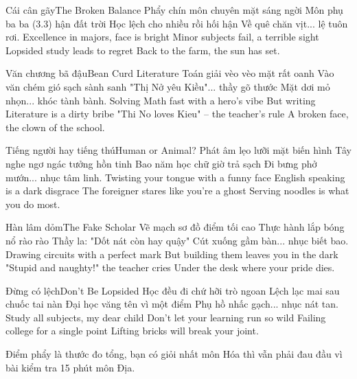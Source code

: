 \begin{tutuyetbox}{Cái cân gãy}{The Broken Balance}
Phẩy chín môn chuyên mặt sáng ngời
Môn phụ ba ba (3.3) hận đất trời
Học lệch cho nhiều rồi hối hận
Về quê chăn vịt... lệ tuôn rơi.
\tcblower
Excellence in majors, face is bright
Minor subjects fail, a terrible sight
Lopsided study leads to regret
Back to the farm, the sun has set.
\end{tutuyetbox}

\begin{tutuyetbox}{Văn chương bã đậu}{Bean Curd Literature}
Toán giải vèo vèo mặt rất oanh
Vào văn chém gió sạch sành sanh
"Thị Nở yêu Kiều"... thầy gõ thước
Mặt dơi mỏ nhọn... khóc tành bành.
\tcblower
Solving Math fast with a hero's vibe
But writing Literature is a dirty bribe
"Thi No loves Kieu" – the teacher's rule
A broken face, the clown of the school.
\end{tutuyetbox}

\begin{tutuyetbox}{Tiếng người hay tiếng thú}{Human or Animal?}
Phát âm lẹo lưỡi mặt biến hình
Tây nghe ngơ ngác tưởng hồn tinh
Bao năm học chữ giờ trả sạch
Đi bưng phở mướn... nhục tâm linh.
\tcblower
Twisting your tongue with a funny face
English speaking is a dark disgrace
The foreigner stares like you're a ghost
Serving noodles is what you do most.
\end{tutuyetbox}

\begin{tutuyetbox}{Hàn lâm dỏm}{The Fake Scholar}
Vẽ mạch sơ đồ điểm tối cao
Thực hành lắp bóng nổ rào rào
Thầy la: "Dốt nát còn hay quậy"
Cút xuống gầm bàn... nhục biết bao.
\tcblower
Drawing circuits with a perfect mark
But building them leaves you in the dark
"Stupid and naughty!" the teacher cries
Under the desk where your pride dies.
\end{tutuyetbox}

\begin{tutuyetbox}{Đừng có lệch}{Don't Be Lopsided}
Học đều đi chứ hỡi trò ngoan
Lệch lạc mai sau chuốc tai nàn
Đại học văng tên vì một điểm
Phụ hồ nhấc gạch... nhục nát tan.
\tcblower
Study all subjects, my dear child
Don't let your learning run so wild
Failing college for a single point
Lifting bricks will break your joint.
\end{tutuyetbox}

\begin{ghichu}
Điểm phẩy là thước đo tổng, bạn có giỏi nhất môn Hóa thì vẫn phải đau đầu vì bài kiểm tra 15 phút môn Địa.
\end{ghichu}
